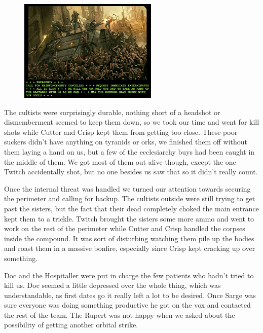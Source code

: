 \begin{figure}
	\begin{center}
		\includegraphics[width=\figwidth]{pics/6/24.png}
	\end{center}
\end{figure}
The cultists were surprisingly durable, nothing short of a headshot or dismemberment seemed to keep them down, so we took our time and went for kill shots while Cutter and Crisp kept them from getting too close. 
These poor suckers didn't have anything on tyranids or orks, we finished them off without them laying a hand on us, but a few of the ecclesiarchy buys had been caught in the middle of them. 
We got most of them out alive though, except the one Twitch accidentally shot, but no one besides us saw that so it didn't really count. 

Once the internal threat was handled we turned our attention towards securing the perimeter and calling for backup. 
The cultists outside were still trying to get past the sisters, but the fact that their dead completely choked the main entrance kept them to a trickle. 
Twitch brought the sisters some more ammo and went to work on the rest of the perimeter while Cutter and Crisp handled the corpses inside the compound. 
It was sort of disturbing watching them pile up the bodies and roast them in a massive bonfire, especially since Crisp kept cracking up over something.

Doc and the Hospitaller were put in charge the few patients who hadn't tried to kill us. 
Doc seemed a little depressed over the whole thing, which was understandable, as first dates go it really left a lot to be desired. 
Once Sarge was sure everyone was doing something productive he got on the vox and contacted the rest of the team. 
The Rupert was not happy when we asked about the possibility of getting another orbital strike.

